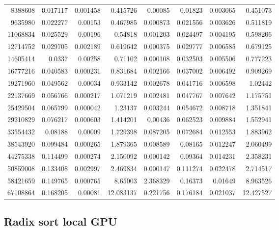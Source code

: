\begin{longtable}{r r r r r r r r}
8388608 & 0.017117 & 0.001458 & 0.415726 & 0.00085 & 0.01823 & 0.003065 & 0.451073 \\
9635980 & 0.022277 & 0.00153 & 0.467985 & 0.000873 & 0.021556 & 0.003626 & 0.511819 \\
11068834 & 0.025529 & 0.00196 & 0.54818 & 0.001203 & 0.024497 & 0.004195 & 0.598206 \\
12714752 & 0.029705 & 0.002189 & 0.619642 & 0.000375 & 0.029777 & 0.006585 & 0.679125 \\
14605414 & 0.0337 & 0.00258 & 0.71102 & 0.000108 & 0.032503 & 0.005506 & 0.777223 \\
16777216 & 0.040583 & 0.000231 & 0.831684 & 0.002166 & 0.037002 & 0.006492 & 0.909269 \\
19271960 & 0.049562 & 0.00034 & 0.933142 & 0.002678 & 0.041716 & 0.006598 & 1.02442 \\
22137669 & 0.056766 & 0.000217 & 1.071219 & 0.002481 & 0.047767 & 0.007642 & 1.175751 \\
25429504 & 0.065799 & 0.000042 & 1.23137 & 0.003244 & 0.054672 & 0.008718 & 1.351841 \\
29210829 & 0.076217 & 0.000603 & 1.414201 & 0.00436 & 0.062523 & 0.009884 & 1.552941 \\
33554432 & 0.08188 & 0.00009 & 1.729398 & 0.087205 & 0.072684 & 0.012553 & 1.883962 \\
38543920 & 0.099484 & 0.000265 & 1.879365 & 0.008589 & 0.08165 & 0.012247 & 2.060499 \\
44275338 & 0.114499 & 0.000274 & 2.150092 & 0.000142 & 0.09364 & 0.014231 & 2.358231 \\
50859008 & 0.133408 & 0.002997 & 2.469834 & 0.000147 & 0.111274 & 0.022478 & 2.714517 \\
58421659 & 0.149765 & 0.000765 & 8.65003 & 2.368329 & 0.16373 & 0.01649 & 8.963526 \\
67108864 & 0.168205 & 0.00081 & 12.083137 & 0.221756 & 0.176184 & 0.021037 & 12.427527 \\
\end{longtable}

\subsection*{Radix sort local GPU}

